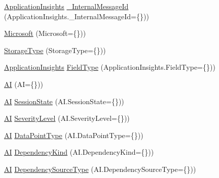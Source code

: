 \begin{DoxyCompactItemize}
\item 
\hyperlink{_scripts_2ai_80_822_89-build00167_8js_aa415ef4f8cdd699689ef4b61db7656d8}{Application\+Insights} \hyperlink{_scripts_2ai_80_822_89-build00167_8js_a0825f4bc80a3a4696938ea70f7793f3b}{\+\_\+\+Internal\+Message\+Id} (Application\+Insights.\+\_\+\+Internal\+Message\+Id=\{\}))
\item 
\hyperlink{_scripts_2ai_80_822_89-build00167_8js_aa18e57a9e282b8cdff692e2819a82a4f}{Microsoft} (Microsoft=\{\}))
\item 
\hyperlink{_scripts_2ai_80_822_89-build00167_8js_ae12b8f4a2b3e8969d0c265448b72c222}{Storage\+Type} (Storage\+Type=\{\}))
\item 
\hyperlink{_scripts_2ai_80_822_89-build00167_8js_aa415ef4f8cdd699689ef4b61db7656d8}{Application\+Insights} \hyperlink{_scripts_2ai_80_822_89-build00167_8js_aad38300ec9ff4d9c31a92adaa89756c9}{Field\+Type} (Application\+Insights.\+Field\+Type=\{\}))
\item 
\hyperlink{_scripts_2ai_80_822_89-build00167_8js_a928268398fa5822b5b62bb9de35877dd}{AI} (AI=\{\}))
\item 
\hyperlink{_scripts_2ai_80_822_89-build00167_8js_a928268398fa5822b5b62bb9de35877dd}{AI} \hyperlink{_scripts_2ai_80_822_89-build00167_8js_a83607050b8e5441f90ecb58dbf77a543}{Session\+State} (A\+I.\+Session\+State=\{\}))
\item 
\hyperlink{_scripts_2ai_80_822_89-build00167_8js_a928268398fa5822b5b62bb9de35877dd}{AI} \hyperlink{_scripts_2ai_80_822_89-build00167_8js_a57d4bf254a5b6a23f371b3188e8b6de9}{Severity\+Level} (A\+I.\+Severity\+Level=\{\}))
\item 
\hyperlink{_scripts_2ai_80_822_89-build00167_8js_a928268398fa5822b5b62bb9de35877dd}{AI} \hyperlink{_scripts_2ai_80_822_89-build00167_8js_a0b0c021ead88e623cf692770b557c32d}{Data\+Point\+Type} (A\+I.\+Data\+Point\+Type=\{\}))
\item 
\hyperlink{_scripts_2ai_80_822_89-build00167_8js_a928268398fa5822b5b62bb9de35877dd}{AI} \hyperlink{_scripts_2ai_80_822_89-build00167_8js_a33df44d856645f38dc306e921cf8aff9}{Dependency\+Kind} (A\+I.\+Dependency\+Kind=\{\}))
\item 
\hyperlink{_scripts_2ai_80_822_89-build00167_8js_a928268398fa5822b5b62bb9de35877dd}{AI} \hyperlink{_scripts_2ai_80_822_89-build00167_8js_affcf2bfd934556ae1978f60fa1ddcf10}{Dependency\+Source\+Type} (A\+I.\+Dependency\+Source\+Type=\{\}))
\end{DoxyCompactItemize}
